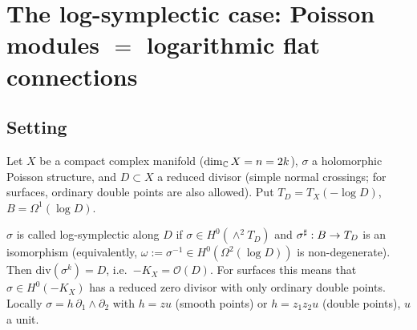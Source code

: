 \section{The log-symplectic case: Poisson modules $=$ logarithmic flat connections}\label{sec:logsymp}
\subsection{Setting}
Let $X$ be a compact complex manifold ($\dim_\mathbb C X=n=2k$), $\sigma$ a holomorphic Poisson structure, and $D\subset X$ a reduced divisor (simple normal crossings; for surfaces, ordinary double points are also allowed).
Put $T_D=T_X(-\log D)$, $B=\Omega^1(\log D)$.

\begin{defn}\tC
$\sigma$ is called log-symplectic along $D$ if $\sigma\in H^0(\wedge^2T_D)$ and $\sigma^\sharp:B\to T_D$ is an isomorphism (equivalently, $\omega:=\sigma^{-1}\in H^0(\Omega^2(\log D))$ is non-degenerate). Then $\mathrm{div}(\sigma^k)=D$, i.e.\ $-K_X=\mathcal O(D)$.
For surfaces this means that $\sigma\in H^0(-K_X)$ has a reduced zero divisor with only ordinary double points. Locally $\sigma=h\,\partial_1\wedge\partial_2$ with $h=zu$ (smooth points) or $h=z_1z_2u$ (double points), $u$ a unit.
\end{defn}

